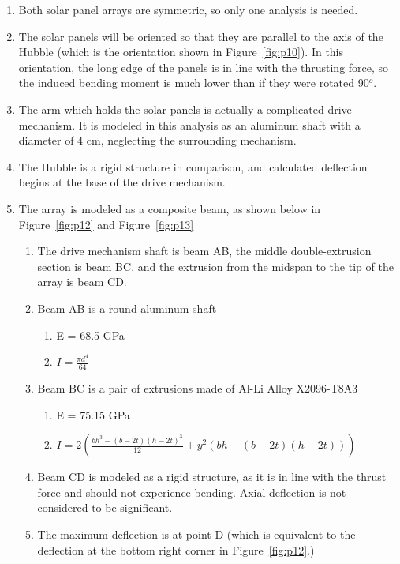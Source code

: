 \documentclass[paper=letter, fontsize=11pt]{scrartcl} %
\numberwithin{equation}{section} %
\numberwithin{figure}{section} %
\numberwithin{table}{section} %
\begin{document}
\begin{enumerate}
    \item Both solar panel arrays are symmetric, so only one analysis is needed.
    \item The solar panels will be oriented so that they are parallel to the axis of the Hubble (which is the orientation shown in Figure~\ref{fig:p10}). In this orientation, the long edge of the panels is in line with the thrusting force, so the induced bending moment is much lower than if they were rotated 90$^o$.
    \item The arm which holds the solar panels is actually a complicated drive mechanism. It is modeled in this analysis as an aluminum shaft with a diameter of 4 cm, neglecting the surrounding mechanism.
    \item The Hubble is a rigid structure in comparison, and calculated deflection begins at the base of the drive mechanism.
    \item The array is modeled as a composite beam, as shown below in Figure~\ref{fig:p12} and Figure~\ref{fig:p13}
          \begin{enumerate}
            \item The drive mechanism shaft is beam AB, the middle double-extrusion section is beam BC, and the extrusion from the midspan to the tip of the array is beam CD.
            \item Beam AB is a round aluminum shaft
                  \begin{enumerate}
                    \item   E = 68.5 GPa
                    \item $I = \frac{\pi d^4}{64}$
                  \end{enumerate}
            \item Beam BC is a pair of extrusions made of Al-Li Alloy X2096-T8A3
                  \begin{enumerate}
                    \item   E = 75.15 GPa
                    \item $I = 2 \left(\frac{bh^3-(b-2t)(h-2t)^3}{12} + y^2(bh - (b-2t)(h-2t)) \right)$
                  \end{enumerate}
            \item Beam CD is modeled as a rigid structure, as it is in line with the thrust force and should not experience bending. Axial deflection is not considered to be significant.
            \item The maximum deflection is at point D (which is equivalent to the deflection at the bottom right corner in Figure~\ref{fig:p12}.)

\end{enumerate}
\end{enumerate}
\end{document}
